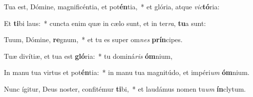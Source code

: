 \item Tua est, Dómine, magnificéntia, et pot\textbf{én}tia,~* et glória, atque \textit{vic}\textbf{tó}ria:
\item Et \textbf{ti}bi laus:~* cuncta enim quæ in cælo sunt, et in ter\textit{ra}, \textbf{tu}a sunt:
\item Tuum, Dómine, \textbf{re}gnum,~* et tu es super om\textit{nes} \textbf{prín}cipes.
\item Tuæ divítiæ, et tua est \textbf{gló}ria:~* tu dominá\textit{ris} \textbf{óm}nium,
\item In manu tua virtus et pot\textbf{én}tia:~* in manu tua magnitúdo, et impéri\textit{um} \textbf{óm}nium.
\item Nunc ígitur, Deus noster, confitémur \textbf{ti}bi,~* et laudámus nomen tu\textit{um} \textbf{ín}clytum.
